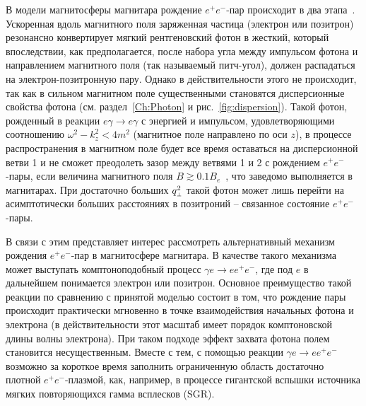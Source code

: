 В модели магнитосферы магнитара рождение $e^+e^-$-пар происходит в два 
этапа~\cite{Beloborodov:2007}. Ускоренная вдоль магнитного поля 
заряженная частица (электрон или позитрон)  
резонансно конвертирует мягкий рентгеновский 
фотон в жесткий, который впоследствии, как предполагается, 
после набора угла между импульсом фотона и направлением 
магнитного поля (так называемый питч-угол), 
должен распадаться на электрон-позитронную пару.  Однако в действительности этого не происходит, так как 
в сильном магнитном поле существенными становятся 
дисперсионные свойства фотона (см. раздел~\ref{Ch:Photon}  и 
рис.~\ref{fig:dispersion}). Такой фотон, рожденный 
в реакции $e\gamma \to e \gamma$ с энергией и импульсом, удовлетворяющими соотношению 
$\omega^2-k_z^2 < 4m^2$ (магнитное поле направлено по оси $z$), в процессе 
распространения 
в магнитном поле будет все время оставаться на дисперсионной ветви 1 и не сможет преодолеть 
зазор между ветвями 1 и 2 с рождением $e^+e^-$-пары, если 
величина магнитного поля $B \gtrsim 0.1 B_e$~\cite{Shabad:1975,ShabUsov:1982,ShabUsov:1985}, 
что заведомо выполняется в магнитарах. 
При достаточно больших $q^2_{\mbox{\tiny $\bot$}}$ 
такой фотон может лишь перейти на асимптотически больших расстояниях 
в позитроний -- связанное состояние $e^+e^-$-пары. 



В связи с этим представляет интерес рассмотреть альтернативный механизм  рождения 
$e^+e^-$-пар в магнитосфере магнитара. В качестве такого механизма может выступать 
комптоноподобный процесс $\gamma e \to e e^+e^-$, где 
под $e$ в дальнейшем понимается электрон или позитрон. 
Основное преимущество такой реакции по сравнению с принятой 
моделью состоит в том, что рождение пары происходит практически мгновенно в точке взаимодействия 
начальных фотона и электрона 
(в действительности этот масштаб имеет порядок комптоновской длины волны электрона). При таком 
подходе эффект захвата фотона полем становится несущественным. 
Вместе с тем, с помощью 
реакции $\gamma e \to e e^+e^-$ возможно за короткое время заполнить 
ограниченную область 
 достаточно плотной 
$e^+e^-$-плазмой, как, например, 
в процессе гигантской вспышки источника мягких повторяющихся 
гамма всплесков (SGR).

%


